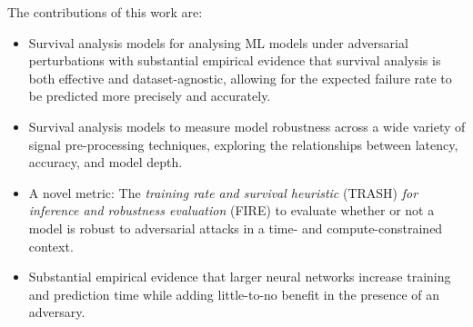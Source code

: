 The contributions of this work are:
\begin{itemize}
	\item Survival analysis models for analysing ML models under adversarial perturbations with substantial empirical evidence that survival analysis is both effective and dataset-agnostic, allowing for the expected failure rate to be predicted more precisely and accurately.
	\item Survival analysis models to measure model robustness across a wide variety of signal pre-processing techniques, exploring the relationships between latency, accuracy, and model depth.
	\item A novel metric: The \textit{training rate and survival heuristic } (TRASH) \textit{for inference and robustness evaluation} (FIRE) to evaluate whether or not a model is robust to adversarial attacks in a time- and compute-constrained context.
	\item Substantial empirical evidence that larger neural networks increase training and prediction time while adding little-to-no benefit in the presence of an adversary.
\end{itemize}
